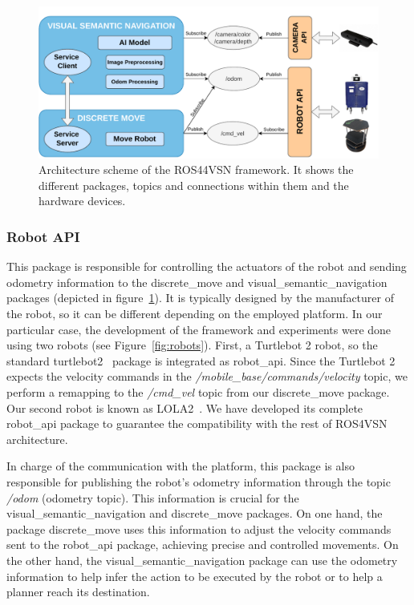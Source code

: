 \begin{figure}
    \centering
    \includegraphics[width=\linewidth]{figures/ros4vsn/arquitectura_paper}
    \caption{Architecture scheme of the ROS44VSN framework.
    It shows the different packages, topics and connections within them and the hardware devices.}
    \label{fig:arch_scheme}
\end{figure}

\subsubsection{Robot API}\label{subsubsec:robot-api2}

This package is responsible for controlling the actuators of the robot and sending odometry information to the discrete\_move and visual\_semantic\_navi\-gation packages (depicted in figure~\ref{fig:arch_scheme}).
It is typically designed by the manufacturer of the robot, so it can be different depending on the employed platform.
In our particular case, the development of the framework and experiments were done using two robots (see Figure~\ref{fig:robots}).
First, a Turtlebot 2 robot, so the standard turtlebot2~\cite{kobuki} package is integrated as robot\_api.
Since the Turtlebot 2 expects the velocity commands in the \textit{/mobile\_base/commands/velocity} topic, we perform a remapping to the \textit{/cmd\_vel} topic from our discrete\_move package.
Our second robot is known as LOLA2~\cite{LOLA}.
We have developed its complete robot\_api package to guarantee the compatibility with the rest of ROS4VSN architecture.

In charge of the communication with the platform, this package is also responsible for publishing the robot's odometry information through the topic \textit{/odom} (odometry topic).
This information is crucial for the visual\_seman\-tic\_navigation and discrete\_move packages.
On one hand, the package discrete\_move uses this information to adjust the velocity commands sent to the robot\_api package, achieving precise and controlled movements.
On the other hand, the visual\_semantic\_navigation package can use the odometry information to help infer the action to be executed by the robot or to help a planner reach its destination.

